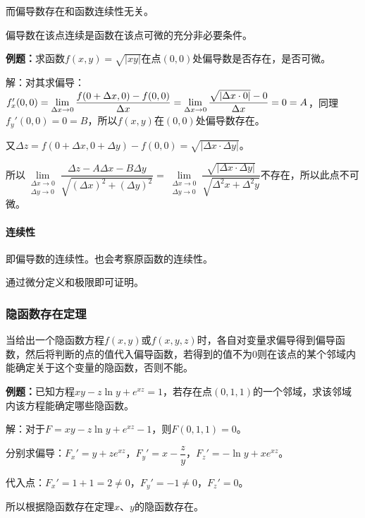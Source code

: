\documentclass[UTF8, 12pt]{ctexart}
\begin{document}
而偏导数存在和函数连续性无关。

偏导数在该点连续是函数在该点可微的充分非必要条件。

\textbf{例题：}求函数$f(x,y)=\sqrt{\vert xy\vert}$在点$(0,0)$处偏导数是否存在，是否可微。

解：对其求偏导：$f_x'(0,0)=\lim\limits_{\Delta x\to0}\dfrac{f(0+\Delta x,0)-f(0,0)}{\Delta x}=\lim\limits_{\Delta x\to0}\dfrac{\sqrt{\vert\Delta x\cdot0\vert}-0}{\Delta x}\\=0=A$，同理$f_y'(0,0)=0=B$，所以$f(x,y)$在$(0,0)$处偏导数存在。

又$\Delta z=f(0+\Delta x,0+\Delta y)-f(0,0)=\sqrt{\vert\Delta x\cdot\Delta y\vert}$。

所以$\lim\limits_{\substack{\Delta x\to0\\\Delta y\to0}}\dfrac{\Delta z-A\Delta x-B\Delta y}{\sqrt{(\Delta x)^2+(\Delta y)^2}}=\lim\limits_{\substack{\Delta x\to0\\\Delta y\to0}}\dfrac{\sqrt{\vert\Delta x\cdot\Delta y\vert}}{\sqrt{\Delta^2x+\Delta^2y}}$不存在，所以此点不可微。

\paragraph{连续性} \leavevmode \medskip

即偏导数的连续性。也会考察原函数的连续性。

通过微分定义和极限即可证明。

\subsubsection{隐函数存在定理}

当给出一个隐函数方程$f(x,y)$或$f(x,y,z)$时，各自对变量求偏导得到偏导函数，然后将判断的点的值代入偏导函数，若得到的值不为0则在该点的某个邻域内能确定关于这个变量的隐函数，否则不能。

\textbf{例题：}已知方程$xy-z\ln y+e^{xz}=1$，若存在点$(0,1,1)$的一个邻域，求该邻域内该方程能确定哪些隐函数。

解：对于$F=xy-z\ln y+e^{xz}-1$，则$F(0,1,1)=0$。

分别求偏导：$F_x'=y+ze^{xz}$，$F_y'=x-\dfrac{z}{y}$，$F_z'=-\ln y+xe^{xz}$。

代入点：$F_x'=1+1=2\neq0$，$F_y'=-1\neq0$，$F_z'=0$。

所以根据隐函数存在定理$x$、$y$的隐函数存在。

\end{document}

